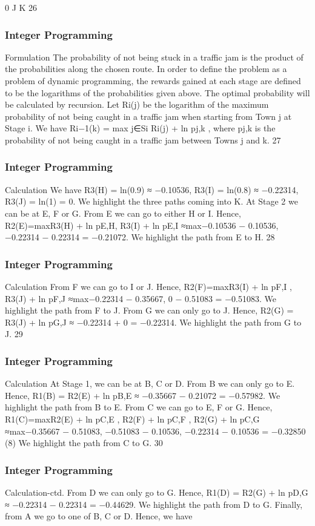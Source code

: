\begin{frame}
0
J
K
26 \end{frame}  \begin{frame} \frametitle{Integer Programming}     
Formulation
The probability of not being stuck in a traffic jam is the product of
the probabilities along the chosen route.
In order to define the problem as a problem of dynamic
programming, the rewards gained at each stage are defined to be
the logarithms of the probabilities given above.
The optimal probability will be calculated by recursion. Let Ri(j)
be the logarithm of the maximum probability of not being caught
in a traffic jam when starting from Town j at Stage i. We have
Ri−1(k) = max
j∈Si
{Ri(j) + ln pj,k },
where pj,k is the probability of not being caught in a traffic jam
between Towns j and k.
27 \end{frame}  \begin{frame} \frametitle{Integer Programming}     
Calculation
We have R3(H) = ln(0.9) ≈ −0.10536,
R3(I) = ln(0.8) ≈ −0.22314, R3(J) = ln(1) = 0.
We highlight the three paths coming into K.
At Stage 2 we can be at E, F or G. From E we can go to either H
or I. Hence,
R2(E)=max{R3(H) + ln pE,H, R3(I) + ln pE,I }
≈max{−0.10536 − 0.10536, −0.22314 − 0.22314} = −0.21072.
We highlight the path from E to H.
28 \end{frame}  \begin{frame} \frametitle{Integer Programming}     
Calculation
From F we can go to I or J. Hence,
R2(F)=max{R3(I) + ln pF,I
, R3(J) + ln pF,J }
≈max{−0.22314 − 0.35667, 0 − 0.51083} = −0.51083.
We highlight the path from F to J.
From G we can only go to J. Hence,
R2(G) = R3(J) + ln pG,J ≈ −0.22314 + 0 = −0.22314.
We highlight the path from G to J.
29 \end{frame}  \begin{frame} \frametitle{Integer Programming}     
Calculation
At Stage 1, we can be at B, C or D. From B we can only go to E.
Hence,
R1(B) = R2(E) + ln pB,E ≈ −0.35667 − 0.21072 = −0.57982.
We highlight the path from B to E.
From C we can go to E, F or G. Hence,
R1(C)=max{R2(E) + ln pC,E , R2(F) + ln pC,F , R2(G) + ln pC,G }
≈max{−0.35667 − 0.51083, −0.51083 − 0.10536,
−0.22314 − 0.10536} = −0.32850 (8)
We highlight the path from C to G.
30 \end{frame}  \begin{frame} \frametitle{Integer Programming}     
Calculation-ctd.
From D we can only go to G. Hence,
R1(D) = R2(G) + ln pD,G ≈ −0.22314 − 0.22314 = −0.44629.
We highlight the path from D to G.
Finally, from A we go to one of B, C or D. Hence, we have

\end{frame}
